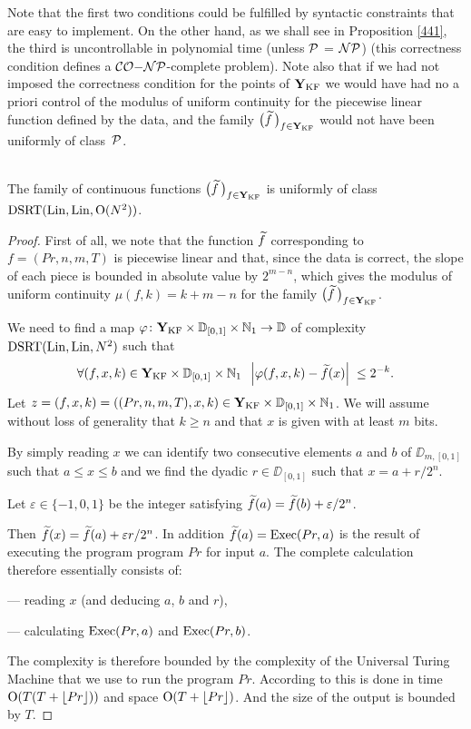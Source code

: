 \begin{remark} \label{412}
 Note that the first two conditions could be fulfilled 
by syntactic constraints that are easy to implement. 
 On the other hand, as we shall see in Proposition \ref{441}, 
the third is uncontrollable in polynomial time (unless ${\cal P}$ = ${\cal NP}$) (this correctness condition defines a ${\cal CO}{\rm-}{\cal NP}$-complete problem). Note also that 
if we had not imposed the correctness condition for the points of ${{\bf Y}_{\rm KF}}$ 
we would have had no a priori control of the modulus of uniform continuity for the piecewise linear function defined by the data, and the family $\big(\widetilde{f}\,\big)_{f \in {{\bf Y}_{\rm KF}}}$ would not have been uniformly of class~${\cal P}$.
\end{remark}

\begin{proposition} \label{413}~\\
The family of continuous functions $\big(\widetilde{f}\,\big)_{f \in {{\bf Y}_{\rm KF}}}$ 
is uniformly of class ${\rm DSRT}({\rm Lin}, {\rm Lin}, {\rm O}(N^2))$. 
\end{proposition}

\begin{proof} 
First of all, we note that the function $\widetilde{f}$ corresponding to 
$f = (Pr, n, m, T)$ is piecewise linear and that, since the data is 
correct, the slope of each piece is bounded in absolute value by 
$2^{m-n}$, which gives the modulus of uniform continuity $\mu(f,k) = k+m-n$ for the family 
$\big(\widetilde{f}\,\big)_{f \in {{\bf Y}_{\rm KF}} }$. 

\noindent 
We need to find a map 
$\varphi\colon {{\bf Y}_{\rm KF}} \times \mathbb {D}_{[0,1]} \times \mathbb {N}_1 \to \mathbb {D}$ of complexity 
${\rm DSRT}({\rm Lin}, {\rm Lin}, N^2)$ such that
\[
\forall (f,x,k) \in {{\bf Y}_{\rm KF}}  \times \mathbb {D}_{[0,1]} \times \mathbb {N}_1 \; \; 
\left|{ \varphi(f,x,k) - \widetilde{f}(x) }\right|\;  \leq 2^{-k}.
\]
Let $z=(f,x,k)=((Pr,n,m,T),x,k) \in {{\bf Y}_{\rm KF}} \times \mathbb {D}_{[0,1]} \times \mathbb {N}_1$.
We will assume without loss of generality that $k \geq n$ and that $x$ 
is given with at least $m$ bits.

\noindent 
By simply reading $x$ we can identify two consecutive elements $a$ and 
$b$ of $\DD_{m,[0,1]}$ such that $a \leq x \leq b$ and we find the 
dyadic $r \in \DD_{[0,1]}$ such that $x=a+r/2^n$. 

\noindent 
Let $\varepsilon \in \{-1,0,1\}$ be the integer satisfying 
$\widetilde{f}(a)=\widetilde{f}(b)+ \varepsilon/2^n$. 

\noindent 
Then $\widetilde{f}(x) = \widetilde{f}(a) + \varepsilon r/2^n$. In addition 
$\widetilde{f}(a)= {\rm Exec} (Pr,a)$ is the result of executing the program 
program $Pr$ for input $a$.
The complete calculation therefore essentially consists of:
 

\noindent 
--- reading $x$ (and deducing $a$, $b$ and $r$),

\noindent 
--- calculating ${\rm Exec} (Pr,a)$ and ${\rm Exec} (Pr,b)$.

\noindent 
The complexity is therefore bounded by the complexity of the Universal Turing Machine that 
we use to run the program $Pr$. According to  
this is done in time ${\rm O}(T(T+ \lfloor Pr \rfloor))$ and space ${\rm O}(T+ \lfloor Pr \rfloor)$. And the size of the output is bounded by $T$. 
\end{proof}

